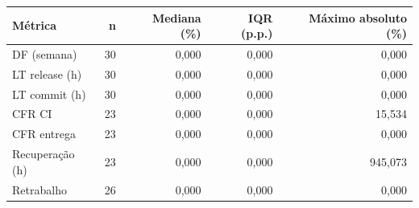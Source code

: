 \begin{tabular}{lrrrr}
\hline
Métrica & n & Mediana (\%) & IQR (p.p.) & Máximo absoluto (\%) \\
\hline
DF (semana) & 30 & 0,000 & 0,000 & 0,000 \\
LT release (h) & 30 & 0,000 & 0,000 & 0,000 \\
LT commit (h) & 30 & 0,000 & 0,000 & 0,000 \\
CFR CI & 23 & 0,000 & 0,000 & 15,534 \\
CFR entrega & 23 & 0,000 & 0,000 & 0,000 \\
Recuperação (h) & 23 & 0,000 & 0,000 & 945,073 \\
Retrabalho & 26 & 0,000 & 0,000 & 0,000 \\
\hline
\end{tabular}
